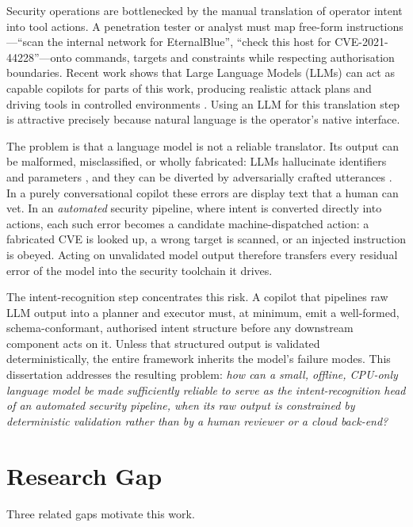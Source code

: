 Security operations are bottlenecked by the manual translation of operator intent
into tool actions. A penetration tester or analyst must map free-form
instructions---``scan the internal network for EternalBlue'', ``check this host
for CVE-2021-44228''---onto commands, targets and constraints while respecting
authorisation boundaries. Recent work shows that Large Language Models (LLMs) can
act as capable copilots for parts of this work, producing realistic attack plans
and driving tools in controlled environments \parencite{deng2024pentestgpt,
happe2023pwned}. Using an LLM for this translation step is attractive precisely
because natural language is the operator's native interface.

The problem is that a language model is not a reliable translator. Its output can
be malformed, misclassified, or wholly fabricated: LLMs hallucinate identifiers
and parameters \parencite{ji2023hallucination}, and they can be diverted by
adversarially crafted utterances \parencite{greshake2023indirect,
liu2023promptinjection}. In a purely conversational copilot these errors are
display text that a human can vet. In an \emph{automated} security pipeline,
where intent is converted directly into actions, each such error becomes a
candidate machine-dispatched action: a fabricated CVE is looked up, a wrong
target is scanned, or an injected instruction is obeyed. Acting on unvalidated
model output therefore transfers every residual error of the model into the
security toolchain it drives.

The intent-recognition step concentrates this risk. A copilot that pipelines raw
LLM output into a planner and executor must, at minimum, emit a well-formed,
schema-conformant, authorised intent structure before any downstream component
acts on it. Unless that structured output is validated deterministically, the
entire framework inherits the model's failure modes. This dissertation addresses
the resulting problem: \emph{how can a small, offline, CPU-only language model be
made sufficiently reliable to serve as the intent-recognition head of an
automated security pipeline, when its raw output is constrained by deterministic
validation rather than by a human reviewer or a cloud back-end?}

\section{Research Gap}\label{sec:research-gap}

Three related gaps motivate this work.

